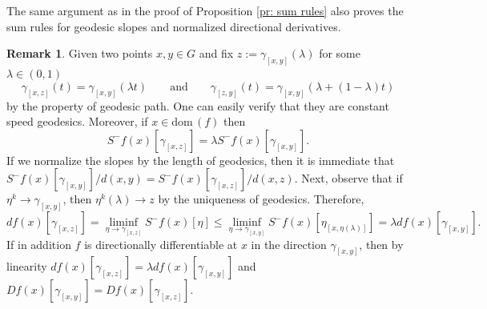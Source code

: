 \documentclass{article}
\theoremstyle{plain}\newtheorem{theorem}{Theorem}[section]
\theoremstyle{plain}\newtheorem{definition}[theorem]{Definition}
\theoremstyle{plain}\newtheorem{lemma}[theorem]{Lemma}
\theoremstyle{definition}\newtheorem{remark}[theorem]{Remark}
\theoremstyle{definition}\newtheorem{example}[theorem]{Example}
\theoremstyle{plain}\newtheorem{proposition}[theorem]{Proposition}
\theoremstyle{plain}\newtheorem{inference}[theorem]{Inference}
\theoremstyle{plain}\newtheorem{corollary}[theorem]{Corollary}
\theoremstyle{plain}\newtheorem{assumption}[theorem]{Assumption}
\begin{document}
The same argument as in the proof of Proposition \ref{pr: sum rules} also proves the sum rules for geodesic slopes and normalized directional derivatives.
\begin{remark}\label{rm: truncation of geod}
    Given two points $x,y\in G$ and fix $z:=\gamma_{[x,y]}(\lambda)$ for some $\lambda\in(0,1)$
    $$
    \gamma_{[x,z]}(t)=\gamma_{[x,y]}(\lambda t) \qquad\text{and}\qquad \gamma_{[z,y]}(t)=\gamma_{[x,y]}(\lambda+(1-\lambda)t)
    $$
    by the property of geodesic path. One can easily verify that they are constant speed geodesics. Moreover, if $x\in\mathrm{dom}\,(f)$ then
    $$
    S^-f(x)[\gamma_{[x,z]}]=\lambda S^-f(x)[\gamma_{[x,y]}].
    $$
    If we normalize the slopes by the length of geodesics, then it is immediate that $S^-f(x)[\gamma_{[x,y]}]/d(x,y)=S^-f(x)[\gamma_{[x,z]}]/d(x,z)$. Next, observe that if $\eta^k\to\gamma_{[x,y]}$, then $\eta^k(\lambda)\to z$ by the uniqueness of geodesics. Therefore,
    $$
    df(x)[\gamma_{[x,z]}]=\liminf_{\eta\to\gamma_{[x,z]}}S^-f(x)[\eta]\leq\liminf_{\eta\to\gamma_{[x,y]}}S^-f(x)[\eta_{[x,\eta(\lambda)]}]=\lambda df(x)[\gamma_{[x,y]}].
    $$
    If in addition $f$ is directionally differentiable at $x$ in the direction $\gamma_{[x,y]}$, then by linearity $df(x)[\gamma_{[x,z]}]=\lambda df(x)[\gamma_{[x,y]}]$ and $Df(x)[\gamma_{[x,y]}]=Df(x)[\gamma_{[x,z]}]$.
\end{remark}
\end{document}
